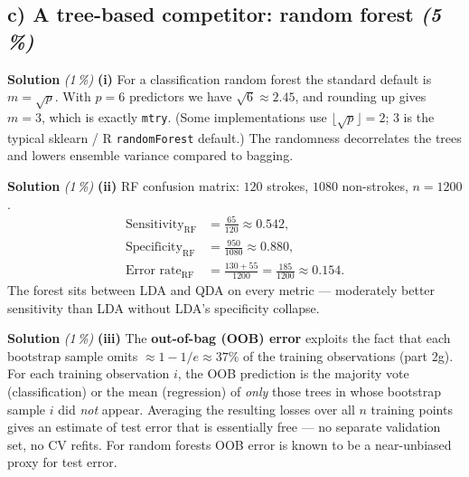 \documentclass[11pt,a4paper]{article}
\newcommand{\subpoints}[1]{\textit{(#1\,\%)}}
\newcommand{\sol}{\noindent\textbf{Solution}}
\begin{document}
\subsection*{c) A tree-based competitor: random forest \subpoints{5}}

\sol{} \subpoints{1} \textbf{(i)} For a classification random forest the standard default is
$m=\sqrt{p}$. With $p=6$ predictors we have $\sqrt{6}\approx 2.45$, and rounding up gives
$\boxed{m=3}$, which is exactly \texttt{mtry}. (Some implementations use $\lfloor\sqrt{p}\rfloor=2$;
$3$ is the typical sklearn / R \texttt{randomForest} default.) The randomness decorrelates the
trees and lowers ensemble variance compared to bagging.

\medskip
\sol{} \subpoints{1} \textbf{(ii)} RF confusion matrix: $120$ strokes, $1080$ non-strokes,
$n=1200$.
\begin{align*}
\text{Sensitivity}_{\mathrm{RF}} &= \frac{65}{120} \approx \boxed{0.542}, \\
\text{Specificity}_{\mathrm{RF}} &= \frac{950}{1080} \approx \boxed{0.880}, \\
\text{Error rate}_{\mathrm{RF}} &= \frac{130+55}{1200} = \frac{185}{1200} \approx \boxed{0.154}.
\end{align*}
The forest sits between LDA and QDA on every metric --- moderately better sensitivity than LDA
without LDA's specificity collapse.

\medskip
\sol{} \subpoints{1} \textbf{(iii)} The \textbf{out-of-bag (OOB) error} exploits the fact that
each bootstrap sample omits $\approx 1-1/e\approx 37\%$ of the training observations
(part 2g). For each training observation $i$, the OOB prediction is the majority vote
(classification) or the mean (regression) of \emph{only} those trees in whose bootstrap sample
$i$ did \emph{not} appear. Averaging the resulting losses over all $n$ training points gives an
estimate of test error that is essentially free --- no separate validation set, no CV refits.
For random forests OOB error is known to be a near-unbiased proxy for test error.
\end{document}
